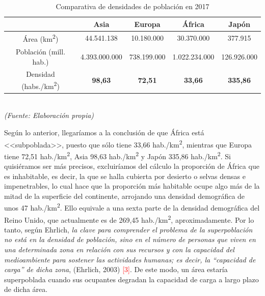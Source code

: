 \begin{table}[h!]
  \begin{center}
    \begin{tabular}{|c|c|c|c|c|} \hline%
    \rowcolor{gray!30} & \textbf{Asia} & \textbf{Europa} & \textbf{\'Africa} & \textbf{Jap\'on}\\ \hline
    \'Area (km\textsuperscript{2})  &  44.541.138 & 10.180.000	& 30.370.000 & 377.915\\ \hline
    Poblaci\'on (mill. hab.)  &  4.393.000.000 & 738.199.000 & 1.022.234.000 & 126.926.000\\ \hline
    \rowcolor{gray!30}  Densidad (habs./km\textsuperscript{2}) & \textbf{98,63} & \textbf{72,51} & \textbf{33,66} & \textbf{335,86}\\ \hline
    \end{tabular}
    \caption{Comparativa de densidades de poblaci\'on en 2017}\\
    \textit{(Fuente: Elaboraci\'on propia)}
    \label{tab:table1}
  \end{center}
\end{table}

\vspace{-0.5cm}
Seg\'un lo anterior, llegar\'iamos a la conclusi\'on de que \'Africa est\'a <<subpoblada>>, puesto que s\'olo tiene 33,66 hab./km\textsuperscript{2}, mientras que Europa tiene 72,51 hab./km\textsuperscript{2}, Asia 98,63 hab./km\textsuperscript{2} y Jap\'on 335,86 hab./km\textsuperscript{2}. Si quisi\'eramos ser m\'as precisos, excluir\'iamos del c\'alculo la proporci\'on de \'Africa que es inhabitable, es decir, la que se halla cubierta por desierto o selvas densas e impenetrables, lo cual hace que la proporci\'on m\'as habitable ocupe algo m\'as de la mitad de la superficie del continente, arrojando una densidad demogr\'afica de unos 47 hab./km\textsuperscript{2}. Ello equivale a una sexta parte de la densidad demogr\'afica del Reino Unido, que actualmente es de 269,45 hab./km\textsuperscript{2}, aproximadamente. Por lo tanto, seg\'un Ehrlich, \textit{la clave para comprender el problema de la superpoblaci\'on no est\'a en la densidad de poblaci\'on, sino en el n\'umero de personas que viven en una determinada zona en relaci\'on con sus recursos y con la capacidad del medioambiente para sostener las actividades humanas; es decir, la ``capacidad de carga'' de dicha zona}, (Ehrlich, 2003) \textcolor{red}{[3]}. De este modo, un \'area estar\'ia superpoblada cuando sus ocupantes degradan la capacidad de carga a largo plazo de dicha \'area.\\

